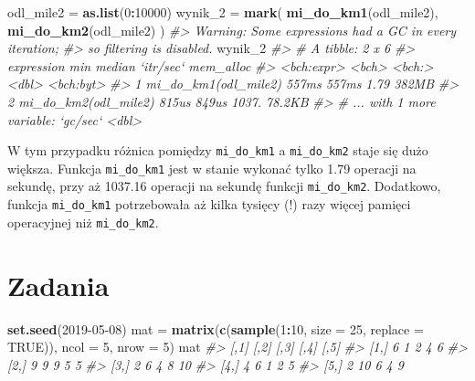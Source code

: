 \documentclass[paper=6in:9in,pagesize=pdftex,headinclude=on,footinclude=on,10pt]{scrbook}
\newenvironment{Shaded}{\begin{snugshade}}{\end{snugshade}}
\newcommand{\CommentTok}[1]{\textcolor[rgb]{0.56,0.35,0.01}{\textit{#1}}}
\newcommand{\DataTypeTok}[1]{\textcolor[rgb]{0.13,0.29,0.53}{#1}}
\newcommand{\DecValTok}[1]{\textcolor[rgb]{0.00,0.00,0.81}{#1}}
\newcommand{\KeywordTok}[1]{\textcolor[rgb]{0.13,0.29,0.53}{\textbf{#1}}}
\newcommand{\NormalTok}[1]{#1}
\newcommand{\OperatorTok}[1]{\textcolor[rgb]{0.81,0.36,0.00}{\textbf{#1}}}
\newcommand{\OtherTok}[1]{\textcolor[rgb]{0.56,0.35,0.01}{#1}}
\newcommand{\StringTok}[1]{\textcolor[rgb]{0.31,0.60,0.02}{#1}}
\begin{document}
\begin{Shaded}
\begin{Highlighting}[]
\NormalTok{odl_mile2 =}\StringTok{ }\KeywordTok{as.list}\NormalTok{(}\DecValTok{0}\OperatorTok{:}\DecValTok{10000}\NormalTok{)}
\NormalTok{wynik_}\DecValTok{2}\NormalTok{ =}\StringTok{ }\KeywordTok{mark}\NormalTok{(}
  \KeywordTok{mi_do_km1}\NormalTok{(odl_mile2),}
  \KeywordTok{mi_do_km2}\NormalTok{(odl_mile2)}
\NormalTok{)}
\CommentTok{#> Warning: Some expressions had a GC in every iteration;}
\CommentTok{#> so filtering is disabled.}
\NormalTok{wynik_}\DecValTok{2}
\CommentTok{#> # A tibble: 2 x 6}
\CommentTok{#>   expression             min median `itr/sec` mem_alloc}
\CommentTok{#>   <bch:expr>           <bch> <bch:>     <dbl> <bch:byt>}
\CommentTok{#> 1 mi_do_km1(odl_mile2) 557ms  557ms      1.79     382MB}
\CommentTok{#> 2 mi_do_km2(odl_mile2) 815us  849us   1037.      78.2KB}
\CommentTok{#> # ... with 1 more variable: `gc/sec` <dbl>}
\end{Highlighting}
\end{Shaded}

W tym przypadku różnica pomiędzy \texttt{mi\_do\_km1} a \texttt{mi\_do\_km2} staje się dużo większa.
Funkcja \texttt{mi\_do\_km1} jest w stanie wykonać tylko 1.79 operacji na sekundę, przy aż 1037.16 operacji na sekundę funkcji \texttt{mi\_do\_km2}.
Dodatkowo, funkcja \texttt{mi\_do\_km1} potrzebowała aż kilka tysięcy (!) razy więcej pamięci operacyjnej niż \texttt{mi\_do\_km2}.

\hypertarget{zadania}{%
\section{Zadania}\label{zadania}}

\begin{Shaded}
\begin{Highlighting}[]
\KeywordTok{set.seed}\NormalTok{(}\DecValTok{2019-05-08}\NormalTok{)}
\NormalTok{mat =}\StringTok{ }\KeywordTok{matrix}\NormalTok{(}\KeywordTok{c}\NormalTok{(}\KeywordTok{sample}\NormalTok{(}\DecValTok{1}\OperatorTok{:}\DecValTok{10}\NormalTok{, }\DataTypeTok{size =} \DecValTok{25}\NormalTok{, }\DataTypeTok{replace =} \OtherTok{TRUE}\NormalTok{)),}
             \DataTypeTok{ncol =} \DecValTok{5}\NormalTok{, }\DataTypeTok{nrow =} \DecValTok{5}\NormalTok{)}
\NormalTok{mat}
\CommentTok{#>      [,1] [,2] [,3] [,4] [,5]}
\CommentTok{#> [1,]    6    1    2    4    6}
\CommentTok{#> [2,]    9    9    9    5    5}
\CommentTok{#> [3,]    2    6    4    8   10}
\CommentTok{#> [4,]    4    6    1    2    5}
\CommentTok{#> [5,]    2   10    6    4    9}
\end{Highlighting}
\end{Shaded}
\end{document}

